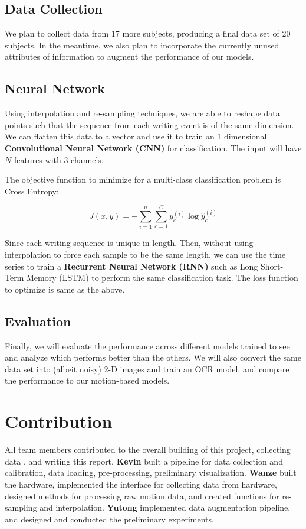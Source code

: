 \documentclass{article}
\begin{document}
\subsection{Data Collection}

We plan to collect data from 17 more subjects, producing a final data set of 20 subjects. In the meantime, we also plan to incorporate the currently unused attributes of information to augment the performance of our models.

\subsection{Neural Network}

Using interpolation and re-sampling techniques, we are able to reshape data points such that the sequence from each writing event is of the same dimension. We can flatten this data to a vector and use it to train an 1 dimensional \textbf{Convolutional Neural Network (CNN)} for classification. The input will have $N$ features with $3$ channels. 

The objective function to minimize for a multi-class classification problem is Cross Entropy:

\[
J(x, y) = - \sum_{i=1}^n \sum_{c=1}^C y_c^{(i)} \log \hat{y}_c^{(i)}
\]

Since each writing sequence is unique in length. Then, without using interpolation to force each sample to be the same length, we can use the time series to train a \textbf{Recurrent Neural Network (RNN)} such as Long Short-Term Memory (LSTM) \cite{bib7} to perform the same classification task. The loss function to optimize is same as the above.

\subsection{Evaluation}

Finally, we will evaluate the performance across different models trained to see and analyze which performs better than the others. We will also convert the same data set into (albeit noisy) 2-D images and train an OCR model, and compare the performance to our motion-based models.

\section*{Contribution}

All team members contributed to the overall building of this project, collecting data , and writing this report.
\textbf{Kevin} built a pipeline for data collection and calibration, data loading, pre-processing, preliminary visualization.
\textbf{Wanze} built the hardware, implemented the interface for collecting data from hardware, designed methods for processing raw motion data, and created functions for re-sampling and interpolation.
\textbf{Yutong} implemented data augmentation pipeline, and designed and conducted the preliminary experiments.
\end{document}
